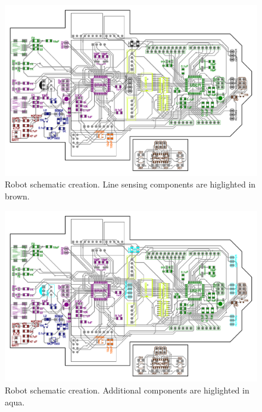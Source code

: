 \documentclass[11pt,a4paper]{article}
\begin{document}
\begin{figure}[H]
  \centering
  \includegraphics[width=\textwidth]{robot_schematic_sensor.pdf}
  \caption{Robot schematic creation. Line sensing components are higlighted in brown.}
\end{figure}


\begin{figure}[H]
  \centering
  \includegraphics[width=\textwidth]{robot_schematic_addtional.pdf}
  \caption{Robot schematic creation. Additional components are higlighted in aqua.}
\end{figure}
\end{document}
